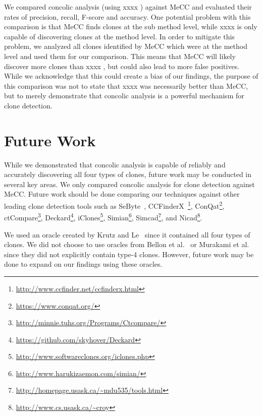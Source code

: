 \documentclass{sig-alternate}
\newif\ifisnopii
\begin{document}
We compared concolic analysis (using \ifisnopii CCCD \else xxxx \fi) against MeCC and evaluated their rates of precision, recall, F-score and accuracy. One potential problem with this comparison is that MeCC finds clones at the sub method level, while \ifisnopii CCCD \else xxxx \fi is only capable of discovering clones at the method level. In order to mitigate this problem, we analyzed all clones identified by MeCC which were at the method level and used them for our comparison. This means that MeCC will likely discover more clones than \ifisnopii CCCD \else xxxx \fi, but could also lead to more false positives. While we acknowledge that this could create a bias of our findings, the purpose of this comparison was not to state that \ifisnopii CCCD \else xxxx \fi was necessarily better than MeCC, but to merely demonstrate that concolic analysis is a powerful mechanism for clone detection.



\section{Future Work}
\label{sec: futurework}
While we demonstrated that concolic analysis is capable of reliably and accurately discovering all four types of clones, future work may be conducted in several key areas. We only compared concolic analysis for clone detection against MeCC. Future work should be done comparing our techniques against other leading clone detection tools such as SeByte~\cite{Keivanloo:2012:JBC:2664398.2664404}, CCFinderX~\footnote{\url{http://www.ccfinder.net/ccfinderx.html}}, ConQat\footnote{\url{https://www.conqat.org/}}, ctCompare\footnote{\url{http://minnie.tuhs.org/Programs/Ctcompare/}}, Deckard\footnote{\url{https://github.com/skyhover/Deckard}}, iClones\footnote{\url{http://www.softwareclones.org/iclones.php}}, Simian\footnote{\url{http://www.harukizaemon.com/simian/}}, Simcad\footnote{\url{http://homepage.usask.ca/~mdu535/tools.html}}, and Nicad\footnote{\url{http://www.cs.usask.ca/~croy}}.

We used an oracle created by Krutz and Le~\cite{Krutz:2014:CCO:2597073.2597127} since it contained all four types of clones. We did not choose to use oracles from Bellon et al.~\cite{4288192} or Murakami et al.~\cite{Murakami:2014:DCR:2597073.2597133} since they did not explicitly contain type-4 clones. However, future work may be done to expand on our findings using these oracles. 

\end{document}
